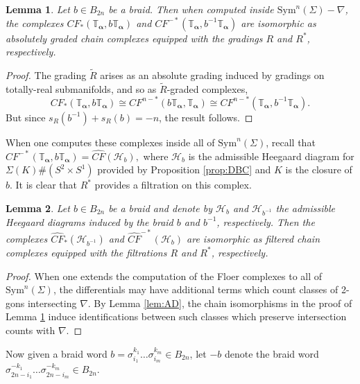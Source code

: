 \documentclass[11pt]{article}
\theoremstyle{plain} \newtheorem{thm}{Theorem}[subsection]
\theoremstyle{plain} \newtheorem{cor}[thm]{Corollary}
\theoremstyle{plain} \newtheorem{prop}[thm]{Proposition}
\theoremstyle{plain} \newtheorem{conj}[thm]{Conjecture}
\theoremstyle{plain} \newtheorem{lem}[thm]{Lemma}
\theoremstyle{definition} \newtheorem{df}[thm]{Definition}
\theoremstyle{remark} \newtheorem{rmk}[thm]{Remark}
\theoremstyle{remark} \newtheorem{obs}[thm]{Observation}
\newcommand{\B}[1]{B_{#1} }
\newcommand{\DBCs}[1]{\Sigma(#1)\#(S^{2}\times S^{1})}
\newcommand{\h}{\mathcal{H}}
\newcommand{\tld}[1]{\widetilde{#1}}
\newcommand{\ba}{\boldsymbol{\alpha}}
\newcommand{\Ta}{\mathbb{T}_{\ba}}
\newcommand{\AD}{\nabla}
\begin{document}
\begin{lem}\label{lem:Rdual1}
Let $b \in \B{2n}$ be a braid.  Then when computed inside $\text{Sym}^{n}(\Sigma) - \AD$, the complexes $CF_{*}\left(\Ta, b\Ta \right)$ and $CF^{-*}\left(\Ta, b^{-1} \Ta \right)$ are isomorphic as absolutely graded chain complexes equipped with the gradings $R$ and $R^{*}$, respectively.
\end{lem}

\begin{proof}
The grading $\tld{R}$ arises as an absolute grading induced by gradings on totally-real submanifolds, and so as $\tld{R}$-graded complexes,
\begin{equation*}
CF_{*}\left(\Ta, b\Ta \right) \cong CF^{n-*}\left(b\Ta, \Ta \right)
\cong CF^{n-*}\left(\Ta, b^{-1}\Ta \right).
\end{equation*}
But since $s_{R}(b^{-1}) + s_{R}(b) = -n$, the result follows.
\end{proof}

When one computes these complexes inside all of $\text{Sym}^{n}(\Sigma)$, recall that $CF^{-*}\left(\Ta, b \Ta \right) = \widehat{CF}\left( \h_{b} \right),$ where $\h_{b}$ is the admissible Heegaard diagram for $\DBCs{K}$ provided by Proposition \ref{prop:DBC} and $K$ is the closure of $b$.  It is clear that $R^{*}$ provides a filtration on this complex.

\begin{lem}\label{lem:Rdual2}
Let $b\in \B{2n}$ be a braid and denote by $\h_{b}$ and $\h_{b^{-1}}$ the admissible Heegaard diagrams induced by the braid $b$ and $b^{-1}$, respectively.  Then the complexes $\widehat{CF}_{*}\left( \h_{b^{-1}}\right)$ and $\widehat{CF}^{-*}\left( \h_{b}  \right)$ are isomorphic as filtered chain complexes equipped with the filtrations $R$ and $R^{*}$, respectively.
\end{lem}

\begin{proof}
When one extends the computation of the Floer complexes to all of $\text{Sym}^{n}(\Sigma)$, the differentials may have additional terms which count classes of 2-gons intersecting $\AD$.  By Lemma \ref{lem:AD}, the chain isomorphisms in the proof of Lemma \ref{lem:Rdual1} induce identifications between such classes which preserve intersection counts with $\AD$.
\end{proof}

Now given a braid word $b = \sigma_{i_{1}}^{k_{1}} \ldots \sigma_{i_{m}}^{k_{m}} \in \B{2n}$, let $-b$ denote the braid word $\sigma_{2n-i_{1}}^{-k_{1}} \ldots \sigma_{2n-i_{m}}^{-k_{m}} \in \B{2n}$.
\end{document}
